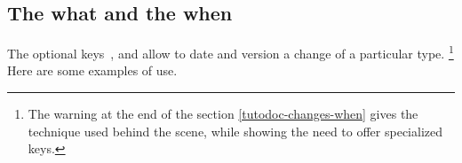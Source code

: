 \documentclass[theme = color]{tutodoc}
\begin{document}
\subsection{The what and the when}

The optional keys \,,  and  allow to date and version a change of a particular type.%
\footnote{
	The warning at the end of the section \ref{tutodoc-changes-when} gives the technique used behind the scene, while showing the need to offer specialized keys.
}
Here are some examples of use.

\end{document}
